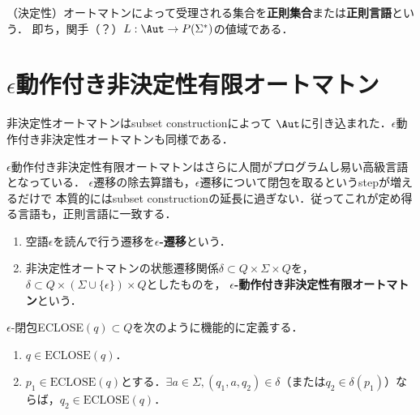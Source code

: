 \begin{definition}
    （決定性）オートマトンによって受理される集合を\textbf{正則集合}または\textbf{正則言語}という．
    即ち，関手（？）$L:\Aut\to P(\Sigma^*)$の値域である．
\end{definition}

\section{$\epsilon$動作付き非決定性有限オートマトン}

\begin{tcolorbox}[colframe=ForestGreen, colback=ForestGreen!10!white, breakable,
    title=$\epsilon$動作付き非決定性オートマトンをAutに引き込む]
    非決定性オートマトンはsubset constructionによって
    $\Aut$に引き込まれた．$\epsilon$動作付き非決定性オートマトンも同様である．

    $\epsilon$動作付き非決定性有限オートマトンはさらに人間がプログラムし易い高級言語となっている．
    $\epsilon$遷移の除去算譜も，$\epsilon$遷移について閉包を取るというstepが増えるだけで
    本質的にはsubset constructionの延長に過ぎない．従ってこれが定め得る言語も，正則言語に一致する．
\end{tcolorbox}

\begin{definition}\mbox{}
    \begin{enumerate}
        \item 空語$\epsilon$を読んで行う遷移を\textbf{$\epsilon$-遷移}という．
        \item 非決定性オートマトンの状態遷移関係$\delta\subset Q\times\Sigma\times Q$を，$\delta\subset Q\times(\Sigma\cup\{\epsilon\})\times Q$としたものを，
        \textbf{$\epsilon$-動作付き非決定性有限オートマトン}という．
    \end{enumerate}
\end{definition}

\begin{definition}
    $\epsilon$-閉包ECLOSE$(q)\subset Q$を次のように機能的に定義する．
    \begin{enumerate}
        \item $q\in\mathrm{ECLOSE}(q)$．
        \item $p_1\in\mathrm{ECLOSE}(q)$とする．$\exists a\in\Sigma, (q_1,a,q_2)\in\delta$（または$q_2\in\delta(p_1)$）ならば，$q_2\in\mathrm{ECLOSE}(q)$．
    \end{enumerate}
\end{definition}

